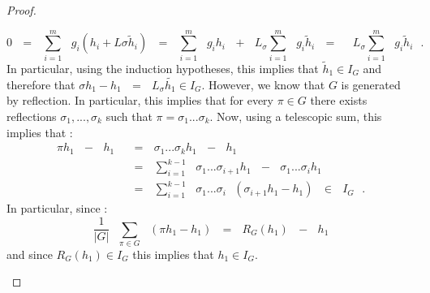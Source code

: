 \documentclass[envcountsame,envcountchap]{svmono}
\newcommand{\modu}[1]{\lvert#1\lvert}
\newcommand{\s}[2]{\sum\limits_{#1}^{#2}}
\newcommand{\qq}{\text{ }}
\begin{document}
\begin{proof}
\begin{itemize}
		\begin{equation}
		0\qq=\qq \s{i=1}{m}\qq g_i (h_i + L\sigma \tilde{h}_i)\qq =\qq \s{i=1}{m}\qq g_i h_i\qq +\qq L_\sigma \s{i=1}{m}\qq g_i \tilde{h}_i\qq =\qq \qq L_\sigma \s{i=1}{m}\qq g_i \tilde{h}_i\qq.
		\end{equation}
		In particular, using the induction hypotheses, this implies that $\tilde{h}_1\in I_G$ and therefore that $\sigma h_1 -h_1 \qq=\qq L_\sigma \tilde{h_1}\in I_G$. However, we know that $G$ is generated by reflection. In particular, this implies that for every $\pi \in G$ there exists reflections $\sigma_1,..., \sigma_k$ such that $\pi = \sigma _1 ... \sigma_k$. Now, using a telescopic sum, this implies that :
		\begin{equation}
		\begin{split}
		\pi h_1 \qq -\qq h_1\qq &=\qq \sigma_1 ... \sigma_k h_1\qq -\qq h_1\\
		&=\qq \s{i=1}{k-1}\qq \sigma_1 ... \sigma_{i+1}h_1\qq-\qq  \sigma_1 ... \sigma_{i}h_1\\
		&=\qq \s{i=1}{k-1}\qq \sigma_1 ... \sigma_{i}\qq (\sigma_{i+1}h_1-h_1)\qq \in \qq I_G\qq.
		\end{split}
		\end{equation}
		In particular, since :
		\begin{equation}
		\frac{1}{\modu{G}}\qq \s{\pi\in G}{}\qq (\pi h_1 -h_1)\qq=\qq R_G(h_1)\qq -\qq h_1
		\end{equation}
		and since $R_G(h_1)\in I_G$ this implies that $h_1 \in I_G$.
	\end{itemize} 
\end{proof}
\end{document}
